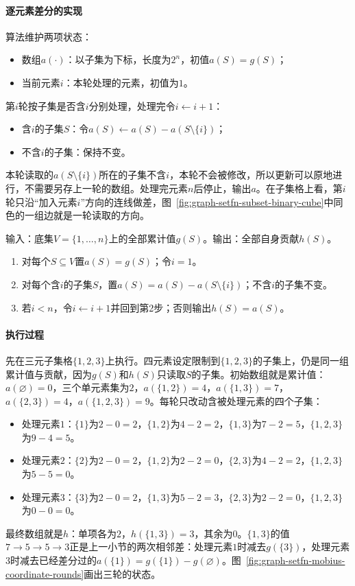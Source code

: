 \paragraph{逐元素差分的实现}
算法维护两项状态：
\begin{itemize}
  \item 数组$a(\cdot)$：以子集为下标，长度为$2^n$，初值$a(S)=g(S)$；
  \item 当前元素$i$：本轮处理的元素，初值为$1$。
\end{itemize}
第$i$轮按子集是否含$i$分别处理，处理完令$i\gets i+1$：
\begin{itemize}
  \item 含$i$的子集$S$：令$a(S)\gets a(S)-a(S\setminus\{i\})$；
  \item 不含$i$的子集：保持不变。
\end{itemize}
本轮读取的$a(S\setminus\{i\})$所在的子集不含$i$，本轮不会被修改，所以更新可以原地进行，不需要另存上一轮的数组。处理完元素$n$后停止，输出$a$。在子集格上看，第$i$轮只沿“加入元素$i$”方向的连线做差，图~\ref{fig:graph-setfn-subset-binary-cube}中同色的一组边就是一轮读取的方向。

\begin{algorithm}[逐元素差分]
\label{alg:graph-setfn-mobius-coordinate}
输入：底集$V=\{1,\ldots,n\}$上的全部累计值$g(S)$。输出：全部自身贡献$h(S)$。
\begin{enumerate}
  \item 对每个$S\subseteq V$置$a(S)=g(S)$；令$i=1$。
  \item 对每个含$i$的子集$S$，置$a(S)=a(S)-a(S\setminus\{i\})$；不含$i$的子集不变。
  \item 若$i<n$，令$i\gets i+1$并回到第2步；否则输出$h(S)=a(S)$。
\end{enumerate}
\end{algorithm}

\paragraph{执行过程}
先在三元子集格$\{1,2,3\}$上执行。四元素设定限制到$\{1,2,3\}$的子集上，仍是同一组累计值与贡献，因为$g(S)$和$h(S)$只读取$S$的子集。初始数组就是累计值：$a(\varnothing)=0$，三个单元素集为$2$，$a(\{1,2\})=4$，$a(\{1,3\})=7$，$a(\{2,3\})=4$，$a(\{1,2,3\})=9$。每轮只改动含被处理元素的四个子集：
\begin{itemize}
  \item 处理元素$1$：$\{1\}$为$2-0=2$，$\{1,2\}$为$4-2=2$，$\{1,3\}$为$7-2=5$，$\{1,2,3\}$为$9-4=5$。
  \item 处理元素$2$：$\{2\}$为$2-0=2$，$\{1,2\}$为$2-2=0$，$\{2,3\}$为$4-2=2$，$\{1,2,3\}$为$5-5=0$。
  \item 处理元素$3$：$\{3\}$为$2-0=2$，$\{1,3\}$为$5-2=3$，$\{2,3\}$为$2-2=0$，$\{1,2,3\}$为$0-0=0$。
\end{itemize}
最终数组就是$h$：单项各为$2$，$h(\{1,3\})=3$，其余为$0$。$\{1,3\}$的值$7\to5\to5\to3$正是上一小节的两次相邻差：处理元素$1$时减去$g(\{3\})$，处理元素$3$时减去已经差分过的$a(\{1\})=g(\{1\})-g(\varnothing)$。图~\ref{fig:graph-setfn-mobius-coordinate-rounds}画出三轮的状态。

